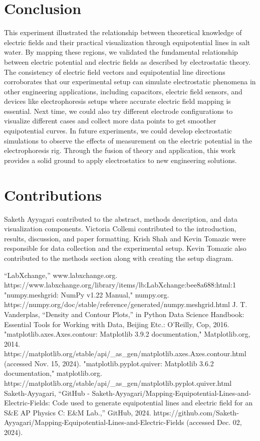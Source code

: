\documentclass[conference]{IEEEtran}
\begin{document}
\section{Conclusion}
This experiment illustrated the relationship between theoretical knowledge of electric fields and their practical visualization through equipotential lines in salt water. By mapping these regions, we validated the fundamental relationship between electric potential and electric fields as described by electrostatic theory. The consistency of electric field vectors and equipotential line directions corroborates that our experimental setup can simulate electrostatic phenomena in other engineering applications, including capacitors, electric field sensors, and devices like electrophoresis setups where accurate electric field mapping is essential. Next time, we could also try different electrode configurations to visualize different cases and collect more data points to get smoother equipotential curves. In future experiments, we could develop electrostatic simulations to observe the effects of measurement on the electric potential in the electrophoresis rig. Through the fusion of theory and application, this work provides a solid ground to apply electrostatics to new engineering solutions.  

\section*{Contributions}
Saketh Ayyagari contributed to the abstract, methods description, and data visualization components. Victoria Collemi contributed to the introduction, results, discussion, and paper formatting. Krish Shah and Kevin Tomazic were responsible for data collection and the experimental setup. Kevin Tomazic also contributed to the methods section along with creating the setup diagram. 

\begin{thebibliography}{00}
 “LabXchange,” www.labxchange.org. https://www.labxchange.org/library/items/lb:LabXchange:bee8a688:html:1
 "numpy.meshgrid: NumPy v1.22 Manual," numpy.org. https://numpy.org/doc/stable/reference/generated/numpy.meshgrid.html
 J. T. Vanderplas, “Density and Contour Plots,” in Python Data Science Handbook: Essential Tools for Working with Data, Beijing Etc.: O’Reilly, Cop, 2016.
 "matplotlib.axes.Axes.contour: Matplotlib 3.9.2 documentation," Matplotlib.org, 2014. https://matplotlib.org/stable/api/\_as\_gen/matplotlib.axes.Axes.contour.html (accessed Nov. 15, 2024).
 "matplotlib.pyplot.quiver: Matplotlib 3.6.2 documentation," matplotlib.org. https://matplotlib.org/stable/api/\_as\_gen/matplotlib.pyplot.quiver.html
 Saketh-Ayyagari, “GitHub - Saketh-Ayyagari/Mapping-Equipotential-Lines-and-Electric-Fields: Code used to generate equipotential lines and electric field for an S\&E AP Physics C: E\&M Lab.,” GitHub, 2024. https://github.com/Saketh-Ayyagari/Mapping-Equipotential-Lines-and-Electric-Fields (accessed Dec. 02, 2024).
‌
‌

\end{thebibliography}
\end{document}
